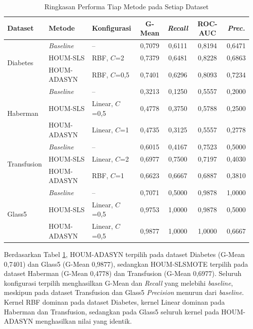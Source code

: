 \begin{table}[H]
\centering
\caption{Ringkasan Performa Tiap Metode pada Setiap Dataset}
\label{table:4.ringkasan}
\footnotesize
\begin{tabular}{|l|l|l|c|c|c|c|}
\hline
\textbf{Dataset} & \textbf{Metode} & \textbf{Konfigurasi} & \textbf{G-Mean} & \textbf{\textit{Recall}} & \textbf{ROC-AUC} & \textbf{\textit{Prec.}} \\
\hline
\multirow{3}{*}{Diabetes} & \textit{Baseline} & -- & 0,7079 & 0,6111 & 0,8194 & 0,6471 \\
\cline{2-7}
 & HOUM-SLS & RBF, $C$=2 & 0,7379 & 0,6481 & 0,8228 & 0,6863 \\
\cline{2-7}
 & HOUM-ADASYN & RBF, $C$=0,5 & 0,7401 & 0,6296 & 0,8093 & 0,7234 \\
\hline
\multirow{3}{*}{Haberman} & \textit{Baseline} & -- & 0,3213 & 0,1250 & 0,5557 & 0,2000 \\
\cline{2-7}
 & HOUM-SLS & Linear, $C$=0,5 & 0,4778 & 0,3750 & 0,5788 & 0,2500 \\
\cline{2-7}
 & HOUM-ADASYN & Linear, $C$=1 & 0,4735 & 0,3125 & 0,5557 & 0,2778 \\
\hline
\multirow{3}{*}{Transfusion} & \textit{Baseline} & -- & 0,6015 & 0,4167 & 0,7523 & 0,5000 \\
\cline{2-7}
 & HOUM-SLS & Linear, $C$=2 & 0,6977 & 0,7500 & 0,7197 & 0,4030 \\
\cline{2-7}
 & HOUM-ADASYN & RBF, $C$=1 & 0,6623 & 0,6667 & 0,6887 & 0,3810 \\
\hline
\multirow{3}{*}{Glass5} & \textit{Baseline} & -- & 0,7071 & 0,5000 & 0,9878 & 1,0000 \\
\cline{2-7}
 & HOUM-SLS & Linear, $C$=0,5 & 0,9753 & 1,0000 & 0,9878 & 0,5000 \\
\cline{2-7}
 & HOUM-ADASYN & Linear, $C$=0,5 & 0,9877 & 1,0000 & 1,0000 & 0,6667 \\
\hline
\end{tabular}
\end{table}

Berdasarkan Tabel \ref{table:4.ringkasan}, HOUM-ADASYN terpilih pada dataset Diabetes (G-Mean 0,7401) dan Glass5 (G-Mean 0,9877), sedangkan HOUM-SLSMOTE terpilih pada dataset Haberman (G-Mean 0,4778) dan Transfusion (G-Mean 0,6977). Seluruh konfigurasi terpilih menghasilkan G-Mean dan \textit{Recall} yang melebihi \textit{baseline}, meskipun pada dataset Transfusion dan Glass5 \textit{Precision} menurun dari \textit{baseline}. Kernel RBF dominan pada dataset Diabetes, kernel Linear dominan pada Haberman dan Transfusion, sedangkan pada Glass5 seluruh kernel pada HOUM-ADASYN menghasilkan nilai yang identik.

